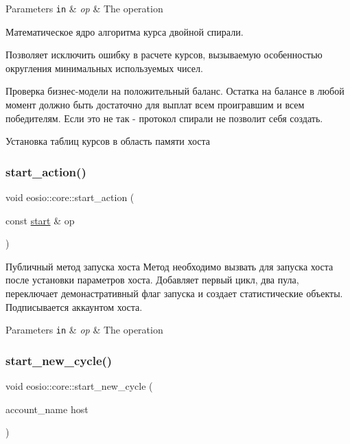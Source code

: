 \begin{DoxyParams}[1]{Parameters}
\mbox{\tt in}  & {\em op} & The operation \\
\hline
\end{DoxyParams}
Математическое ядро алгоритма курса двойной спирали.

Позволяет исключить ошибку в расчете курсов, вызываемую особенностью округления минимальных используемых чисел.

Проверка бизнес-\/модели на положительный баланс. Остатка на балансе в любой момент должно быть достаточно для выплат всем проигравшим и всем победителям. Если это не так -\/ протокол спирали не позволит себя создать.

Установка таблиц курсов в область памяти хоста\mbox{\label{structeosio_1_1core_a52b7bd0a4e7810a9911112c745f43fdb}} 
\subsubsection{\texorpdfstring{start\+\_\+action()}{start\_action()}}
{\footnotesize\ttfamily void eosio\+::core\+::start\+\_\+action (\begin{DoxyParamCaption}\item[{const \mbox{\hyperlink{structeosio_1_1start}{start}} \&}]{op }\end{DoxyParamCaption})\hspace{0.3cm}{\ttfamily [inline]}}



Публичный метод запуска хоста Метод необходимо вызвать для запуска хоста после установки параметров хоста. Добавляет первый цикл, два пула, переключает демонастративный флаг запуска и создает статистические объекты. Подписывается аккаунтом хоста. 


\begin{DoxyParams}[1]{Parameters}
\mbox{\tt in}  & {\em op} & The operation \\
\hline
\end{DoxyParams}
\mbox{\label{structeosio_1_1core_a0d8a3a33305dee1fc3cda981cacf009a}} 
\subsubsection{\texorpdfstring{start\+\_\+new\+\_\+cycle()}{start\_new\_cycle()}}
{\footnotesize\ttfamily void eosio\+::core\+::start\+\_\+new\+\_\+cycle (\begin{DoxyParamCaption}\item[{account\+\_\+name}]{host }\end{DoxyParamCaption})\hspace{0.3cm}{\ttfamily [inline]}}




